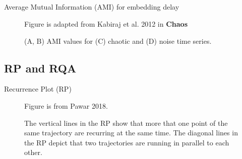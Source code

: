 \subsection{}
{

\begin{frame}{Average Mutual Information (AMI) for embedding delay}
    \begin{figure}
        \centering
	{Figure is adapted from Kabiraj et al. 2012 in {\bf Chaos}}
	\caption{(A, B) AMI values for (C) chaotic and (D) noise time series.} 
   \end{figure}
	
\end{frame}
}








\subsection{RP and RQA}
{

\begin{frame}{Recurrence Plot (RP)}

    \begin{figure}
	{Figure is from Pawar 2018.} 
	\caption{
	The vertical lines in the RP show that more that one point of 
	the same trajectory are recurring at the same time.
	The diagonal lines in the RP depict that two trajectories are running in parallel
	to each other.
}
   
\end{figure}
	


%


\end{frame}
}



